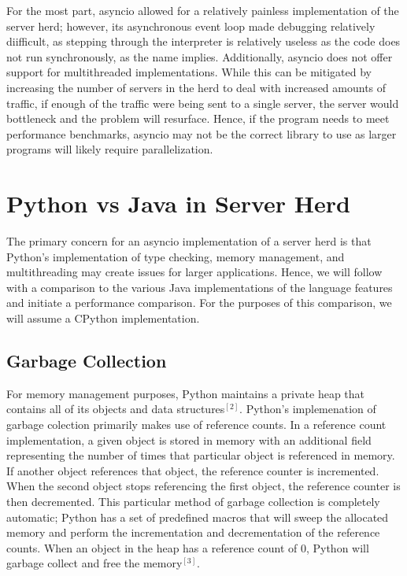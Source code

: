 For the most part, asyncio allowed for a relatively painless implementation of the server herd; however, its asynchronous event loop made debugging relatively diifficult, as stepping through the interpreter is relatively useless as the code does not run synchronously, as the name implies. Additionally, asyncio does not offer support for multithreaded implementations. While this can be mitigated by increasing the number of servers in the herd to deal with increased amounts of traffic, if enough of the traffic were being sent to a single server, the server would bottleneck and the problem will resurface. Hence, if the program needs to meet performance benchmarks, asyncio may not be the correct library to use as larger programs will likely require parallelization.

\section{Python vs Java in Server Herd}

The primary concern for an asyncio implementation of a server herd is that Python's implementation of type checking, memory management, and multithreading may create issues for larger applications. Hence, we will follow with a comparison to the various Java implementations of the language features and initiate a performance comparison. For the purposes of this comparison, we will assume a CPython implementation.

\subsection{Garbage Collection}

For memory management purposes, Python maintains a private heap that contains all of its objects and data structures$^{[2]}$. Python's implemenation of garbage colection primarily makes use of reference counts. In a reference count implementation, a given object is stored in memory with an additional field representing the number of times that particular object is referenced in memory. If another object references that object, the reference counter is incremented. When the second object stops referencing the first object, the reference counter is then decremented. This particular method of garbage collection is completely automatic; Python has a set of predefined macros that will sweep the allocated memory and perform the incrementation and decrementation of the reference counts. When an object in the heap has a reference count of 0, Python will garbage collect and free the memory$^{[3]}$.

